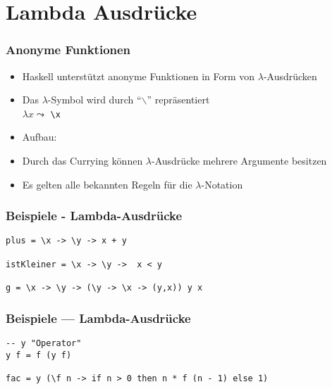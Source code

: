 \documentclass[fleqn,11pt,aspectratio=43]{beamer}
\begin{document}
\section{Lambda Ausdrücke}
\begin{frame}
\frametitle{Anonyme Funktionen}
\begin{block}{\vspace*{-3ex}}
\begin{itemize}
  \item Haskell unterstützt anonyme Funktionen in Form von $\lambda$-Ausdrücken
  \item Das $\lambda$-Symbol wird durch "`$\backslash$"' repräsentiert\\ $\lambda x \leadsto$ \lstinline|\x|
  \item Aufbau: \\
  \item Durch das Currying können $\lambda$-Ausdrücke mehrere Argumente besitzen
  \item Es gelten alle bekannten Regeln für die $\lambda$-Notation
\end{itemize}
\begin{center}
\scalebox{0.8}{}
\end{center}
\end{block}
\end{frame}

\begin{frame}[fragile]
\frametitle{Beispiele - Lambda-Ausdrücke}
\begin{lstlisting}
plus = \x -> \y -> x + y

istKleiner = \x -> \y ->  x < y

g = \x -> \y -> (\y -> \x -> (y,x)) y x
\end{lstlisting}
\end{frame}

\begin{frame}[fragile]
\frametitle{Beispiele --- Lambda-Ausdrücke}
\begin{lstlisting}
-- y "Operator"
y f = f (y f)

fac = y (\f n -> if n > 0 then n * f (n - 1) else 1)
\end{lstlisting}
\end{frame}
\end{document}
